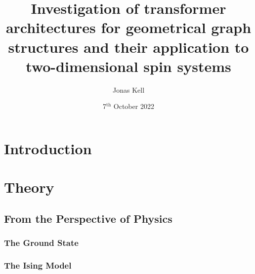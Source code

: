 \documentclass[
headings=optiontohead,              %
12pt,                               %
DIV=13,                             %
twoside=true,                       %
open=any,                         %
BCOR=10mm,                          %
toc=bibliographynumbered            %
]{scrreport}
\title{Investigation of transformer architectures for geometrical graph structures and their application to two-dimensional spin systems}
\author{Jonas Kell}
\date{7$^\text{th}$ October 2022}
\begin{document}
\thispagestyle{empty}                           %
\cleardoublepage                                %
\pagestyle{scrheadings}                         %
\renewcommand{\contentsname}{Table of Contents} %
\tableofcontents                                %
\cleardoublepage                                %

\clearpairofpagestyles
\ihead{\leftmark}
\ohead{\Ifstr{\leftmark}{\rightmark}{}{\rightmark}}
\cfoot*{\pagemark}


\chapter{Introduction}
\label{sec:introduction}

\FloatBarrier
\chapter{Theory}
\label{sec:theory}
    \section{From the Perspective of Physics}
        \label{sec:theory-physics}
        
        \FloatBarrier
        \subsection{The Ground State}
        \label{sec:theory-groundstatesearch}
        
        \subsection{The Ising Model}
        \label{sec:theory-ising}
        
        \FloatBarrier
\end{document}
